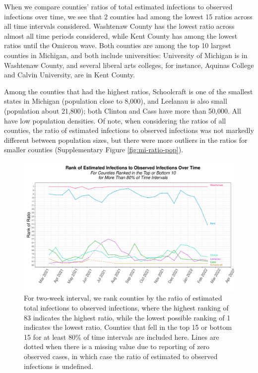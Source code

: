 \documentclass[12pt,twoside]{smiththesis}
\begin{document}
When we compare counties' ratios of total estimated infections to observed infections over time, we see that 2 counties had among the lowest 15 ratios across all time intervals considered. Washtenaw County has the lowest ratio across almost all time periods considered, while Kent County has among the lowest ratios until the Omicron wave. Both counties are among the top 10 largest counties in Michigan, and both include universities: University of Michigan is in Washtenaw County, and several liberal arts colleges, for instance, Aquinas College and Calvin University, are in Kent County.

Among the counties that had the highest ratios, Schoolcraft is one of the smallest states in Michigan (population close to 8,000), and Leelanau is also small (population about 21,800); both Clinton and Cass have more than 50,000. All have low population densities. Of note, when considering the ratios of all counties, the ratio of estimated infections to observed infections was not markedly different between population sizes, but there were more outliers in the ratios for smaller counties (Supplementary Figure \ref{fig:mi-ratio-pop}).
\begin{figure}
\includegraphics[width=1\linewidth]{figure/rank-ratio-over-time-mi-county} \caption{\label{fig:rank-ratio-over-time-mi-county}For two-week interval, we rank counties by the ratio of estimated total infections to observed infections, where the highest ranking of 83 indicates the highest ratio, while the lowest possible ranking of 1 indicates the lowest ratio. Counties that fell in the top 15 or bottom 15 for at least 80\% of time intervals are included here. Lines are dotted when there is a missing value due to reporting of zero observed cases, in which case the ratio of estimated to observed infections is undefined.}\label{fig:unnamed-chunk-98}
\end{figure}
\newpage
\end{document}
